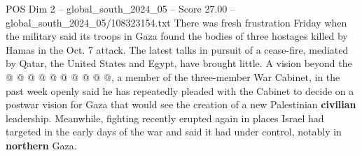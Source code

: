 \begin{textsample}{POS Dim 2 – global\_south\_2024\_05 – Score 27.00 – global\_south\_2024\_05/108323154.txt}
There was fresh frustration Friday when the military said its troops in Gaza found the bodies of three hostages killed by Hamas in the Oct. 7 attack.
The latest talks in pursuit of a cease-fire, mediated by Qatar, the United States and Egypt, have brought little.
A vision beyond the @ @ @ @ @ @ @ @ @ @, a member of the three-member War Cabinet, in the past week openly said he has repeatedly pleaded with the Cabinet to decide on a postwar vision for Gaza that would see the creation of a new Palestinian \textbf{civilian} leadership.
Meanwhile, fighting recently erupted again in places Israel had targeted in the early days of the war and said it had under control, notably in \textbf{northern} Gaza.

\end{textsample}
